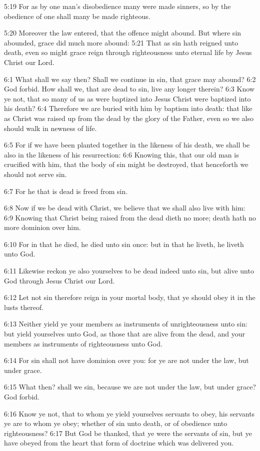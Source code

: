 5:19 For as by one man's disobedience many were made sinners, so by the obedience of one shall many be made righteous.

5:20 Moreover the law entered, that the offence might abound. But where sin abounded, grace did much more abound: 5:21 That as sin hath reigned unto death, even so might grace reign through righteousness unto eternal life by Jesus Christ our Lord.

6:1 What shall we say then? Shall we continue in sin, that grace may abound?  6:2 God forbid. How shall we, that are dead to sin, live any longer therein?  6:3 Know ye not, that so many of us as were baptized into Jesus Christ were baptized into his death?  6:4 Therefore we are buried with him by baptism into death: that like as Christ was raised up from the dead by the glory of the Father, even so we also should walk in newness of life.

6:5 For if we have been planted together in the likeness of his death, we shall be also in the likeness of his resurrection: 6:6 Knowing this, that our old man is crucified with him, that the body of sin might be destroyed, that henceforth we should not serve sin.

6:7 For he that is dead is freed from sin.

6:8 Now if we be dead with Christ, we believe that we shall also live with him: 6:9 Knowing that Christ being raised from the dead dieth no more; death hath no more dominion over him.

6:10 For in that he died, he died unto sin once: but in that he liveth, he liveth unto God.

6:11 Likewise reckon ye also yourselves to be dead indeed unto sin, but alive unto God through Jesus Christ our Lord.

6:12 Let not sin therefore reign in your mortal body, that ye should obey it in the lusts thereof.

6:13 Neither yield ye your members as instruments of unrighteousness unto sin: but yield yourselves unto God, as those that are alive from the dead, and your members as instruments of righteousness unto God.

6:14 For sin shall not have dominion over you: for ye are not under the law, but under grace.

6:15 What then? shall we sin, because we are not under the law, but under grace? God forbid.

6:16 Know ye not, that to whom ye yield yourselves servants to obey, his servants ye are to whom ye obey; whether of sin unto death, or of obedience unto righteousness?  6:17 But God be thanked, that ye were the servants of sin, but ye have obeyed from the heart that form of doctrine which was delivered you.


